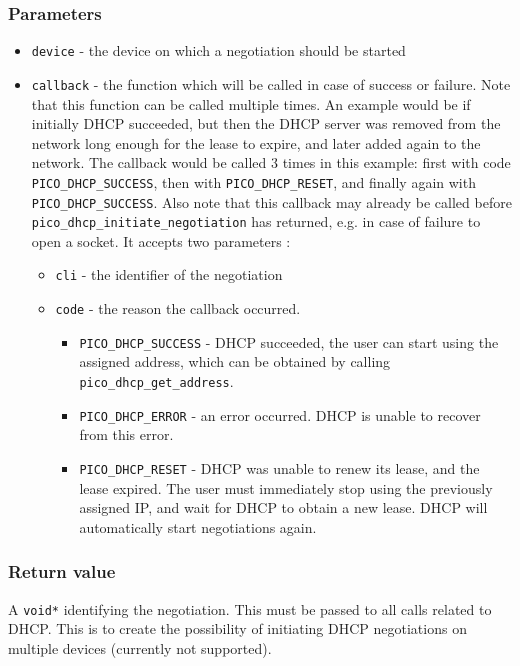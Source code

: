 \subsubsection*{Parameters}
\begin{itemize}
\item \texttt{device} - the device on which a negotiation should be started
\item \texttt{callback} - the function which will be called in case of success or failure. Note that this function can be called multiple times. An example would be if initially DHCP succeeded, but then the DHCP server was removed from the network long enough for the lease to expire, and later added again to the network. The callback would be called 3 times in this example: first with code \texttt{PICO\_DHCP\_SUCCESS}, then with \texttt{PICO\_DHCP\_RESET}, and finally again with \texttt{PICO\_DHCP\_SUCCESS}.
Also note that this callback may already be called before \texttt{pico\_dhcp\_initiate\_negotiation} has returned, e.g. in case of failure to open a socket.
It accepts two parameters : 
\begin{itemize}
\item \texttt{cli} - the identifier of the negotiation
\item \texttt{code} - the reason the callback occurred. 
\begin{itemize}
\item \texttt{PICO\_DHCP\_SUCCESS} - DHCP succeeded, the user can start using the assigned address, which can be obtained by calling \texttt{pico\_dhcp\_get\_address}.
\item \texttt{PICO\_DHCP\_ERROR} - an error occurred. DHCP is unable to recover from this error.
\item \texttt{PICO\_DHCP\_RESET} - DHCP was unable to renew its lease, and the lease expired. The user must immediately stop using the previously assigned IP, and wait for DHCP to obtain a new lease. DHCP will automatically start negotiations again.
\end{itemize}
\end{itemize}
\end{itemize}

\subsubsection*{Return value}
A \texttt{void*} identifying the negotiation. This must be passed to all calls related to DHCP. This is to create the possibility of initiating DHCP negotiations on multiple devices (currently not supported).

